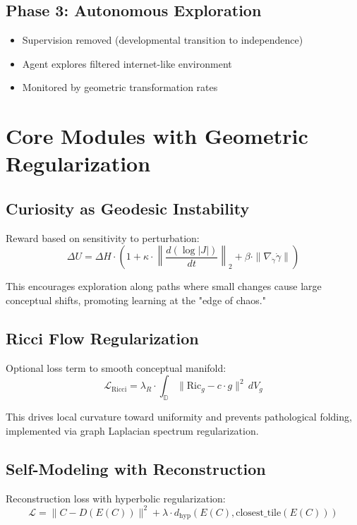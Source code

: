 \documentclass[10pt]{article}
\begin{document}
\subsection{Phase 3: Autonomous Exploration}
\begin{itemize}
    \item Supervision removed (developmental transition to independence)
    \item Agent explores filtered internet-like environment
    \item Monitored by geometric transformation rates
\end{itemize}

\section{Core Modules with Geometric Regularization}

\subsection{Curiosity as Geodesic Instability}

Reward based on sensitivity to perturbation:
$$\Delta U = \Delta H \cdot \left(1 + \kappa \cdot \left\| \frac{d(\log|J|)}{dt} \right\|_2 + \beta \cdot \| \nabla_{\dot{\gamma}} \dot{\gamma} \| \right)$$

This encourages exploration along paths where small changes cause large conceptual shifts, promoting learning at the "edge of chaos."

\subsection{Ricci Flow Regularization}

Optional loss term to smooth conceptual manifold:
$$\mathcal{L}_{\text{Ricci}} = \lambda_R \cdot \int_{\mathbb{D}} \| \text{Ric}_g - c \cdot g \|^2 \, dV_g$$

This drives local curvature toward uniformity and prevents pathological folding, implemented via graph Laplacian spectrum regularization.

\subsection{Self-Modeling with Reconstruction}

Reconstruction loss with hyperbolic regularization:
$$\mathcal{L} = \|C - D(E(C))\|^2 + \lambda \cdot d_{\text{hyp}}(E(C), \text{closest\_tile}(E(C)))$$
\end{document}

